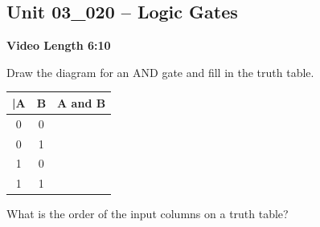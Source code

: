 \documentclass[letterpaper,12pt]{exam}
\newcommand{\unit}{Unit 03}
\begin{document}
\begin{questions}
\section*{\unit\_020 -- Logic Gates }
\par{\selectfont\textbf{Video Length 6:10}}
\begin{samepage}
    \question Draw the diagram for an AND gate and fill in the truth table.
    \par
    \begin{tabular}{|c|c|c|}
      |A & B & A and B \\
      \hline
      \hline
      0 & 0 &  \\
      \hline
      0 & 1 &  \\
      \hline
      1 & 0 &  \\
      \hline
      1 & 1 &  \\  
      \hline     
    \end{tabular}
    \vspace{5mm}
\end{samepage}
\begin{samepage}
    \question What is the order of the input columns on a truth table?
    \vspace{5mm}
\end{samepage}
\par
 

\end{questions}
\end{document}
